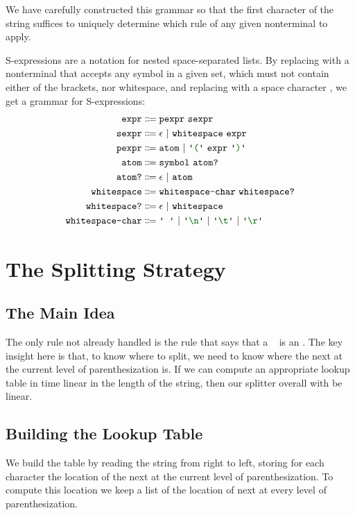   We have carefully constructed this grammar so that the first character of the string suffices to uniquely determine which rule of any given nonterminal to apply.
  
  S-expressions are a notation for nested space-separated lists.  By replacing  with a nonterminal that accepts any symbol in a given set, which must not contain either of the brackets, nor whitespace, and replacing \terminal{+} with a space character \terminal{\ }, we get a grammar for S-expressions:
  \begin{align*}
    \nt{expr} & \Coloneqq \nt{pexpr}~\nt{sexpr} \\
    \nt{sexpr} & \Coloneqq \epsilon~|~\nt{whitespace}~\nt{expr} \\
    \nt{pexpr} & \Coloneqq \nt{atom}~|~\terminal{(}~\nt{expr}~\terminal{)} \\
    \nt{atom} & \Coloneqq \nt{symbol}~\nt{atom?} \\
    \nt{atom?} & \Coloneqq \epsilon~|~\nt{atom} \\
    \nt{whitespace} & \Coloneqq \nt{whitespace-char}~\nt{whitespace?} \\
    \nt{whitespace?} & \Coloneqq \epsilon~|~\nt{whitespace} \\
    \nt{whitespace-char} & \Coloneqq \terminal{\ }~|~\terminal{\textbackslash n}~|~\terminal{\textbackslash t}~|~\terminal{\textbackslash r}
  \end{align*}
  
\section{The Splitting Strategy}
  \subsection{The Main Idea}
    The only rule not already handled is the rule that says that a ~ is an .  The key insight here is that, to know where to split, we need to know where the next \terminal{+} at the current level of parenthesization is.  If we can compute an appropriate lookup table in time linear in the length of the string, then our splitter overall with be linear.
    
  \subsection{Building the Lookup Table}
    We build the table by reading the string from right to left, storing for each character the location of the next \terminal{+} at the current level of parenthesization.  To compute this location we keep a list of the location of next \terminal{+} at every level of parenthesization.
    

